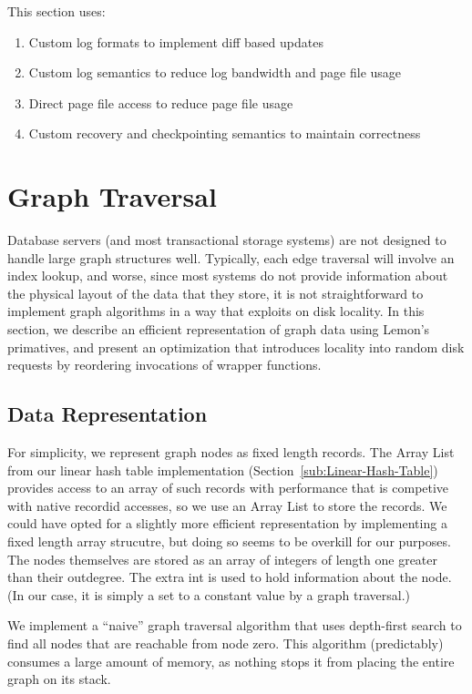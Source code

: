 \documentclass[letterpaper,twocolumn,english]{article}
\newcommand{\yad}{Lemon\xspace}
\begin{document}
This section uses:

\begin{enumerate}
\item{Custom log formats to implement diff based updates}
\item{Custom log semantics to reduce log bandwidth and page file usage}
\item{Direct page file access to reduce page file usage}
\item{Custom recovery and checkpointing semantics to maintain correctness}
\end{enumerate}

\section{Graph Traversal\label{TransClos}}

Database servers (and most transactional storage systems) are not
designed to handle large graph structures well.  Typically, each edge
traversal will involve an index lookup, and worse, since most systems
do not provide information about the physical layout of the data that
they store, it is not straightforward to implement graph algorithms in
a way that exploits on disk locality.  In this section, we describe an
efficient representation of graph data using \yad's primatives, and
present an optimization that introduces locality into random disk
requests by reordering invocations of wrapper functions.

\subsection {Data Representation}

For simplicity, we represent graph nodes as
fixed length records.  The Array List from our linear hash table
implementation (Section~\ref{sub:Linear-Hash-Table}) provides access to an
array of such records with performance that is competive with native
recordid accesses, so we use an Array List to store the records.  We
could have opted for a slightly more efficient representation by
implementing a fixed length array strucutre, but doing so seems to be
overkill for our purposes.  The nodes themselves are stored as an
array of integers of length one greater than their outdegree. The
extra int is used to hold information about the node.  (In our case,
it is simply a set to a constant value by a graph traversal.)

We implement a ``naive'' graph traversal algorithm that uses depth-first search to find all nodes that are reachable from node zero.
This algorithm (predictably) consumes a large amount of memory, as
nothing stops it from placing the entire graph on its stack.  
\end{document}
